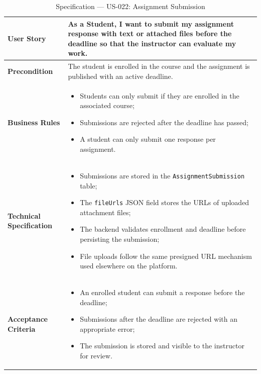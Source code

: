 \begin{table}[H]
\centering
\caption{Specification — US-022: Assignment Submission}
\label{tab:us022}
\renewcommand{\arraystretch}{1.2}
\begin{tabularx}{\textwidth}{|p{3.5cm}|X|}
\hline
\textbf{User Story} & As a Student, I want to submit my assignment response with text or attached files before the deadline so that the instructor can evaluate my work. \\
\hline
\textbf{Precondition} & The student is enrolled in the course and the assignment is published with an active deadline. \\
\hline
\textbf{Business Rules} &
\begin{itemize}[noitemsep, topsep=2pt]
  \item Students can only submit if they are enrolled in the associated course;
  \item Submissions are rejected after the deadline has passed;
  \item A student can only submit one response per assignment.
\end{itemize} \\
\hline
\textbf{Technical Specification} &
\begin{itemize}[noitemsep, topsep=2pt]
  \item Submissions are stored in the \texttt{AssignmentSubmission} table;
  \item The \texttt{fileUrls} JSON field stores the URLs of uploaded attachment files;
  \item The backend validates enrollment and deadline before persisting the submission;
  \item File uploads follow the same presigned URL mechanism used elsewhere on the platform.
\end{itemize} \\
\hline
\textbf{Acceptance Criteria} &
\begin{itemize}[noitemsep, topsep=2pt]
  \item An enrolled student can submit a response before the deadline;
  \item Submissions after the deadline are rejected with an appropriate error;
  \item The submission is stored and visible to the instructor for review.
\end{itemize} \\
\hline
\end{tabularx}
\end{table}

